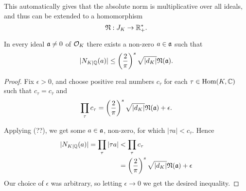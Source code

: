 This automatically gives that the absolute norm is multiplicative over all ideals, and thus can be extended to a homomorphism
\[
	\mathfrak{N} : J_K \to \mathbb{R}^*_+.
\]

\begin{lem}
	In every ideal $\mathfrak{a}\neq 0$ of $\mathcal{O}_K$ there exists a non-zero $a\in\mathfrak{a}$ such that
	\[
		|N_{K\mid\mathbb{Q}}(a)| \leq \left(\frac{2}{\pi}\right)^s\sqrt{|d_K|}\mathfrak{N}(\mathfrak{a}).
	\]
\end{lem}
\begin{proof}
	Fix $\epsilon>0$, and choose positive real numbers $c_\tau$ for each $\tau\in\text{Hom}(K,\mathbb{C})$ such that $c_\tau = c_{\overline{\tau}}$ and
	\[
		\prod_\tau c_\tau = \left(\frac{2}{\pi}\right)^s\sqrt{|d_K|}\mathfrak{N}(\mathfrak{a})+ \epsilon.
	\]

	Applying (??), we get some $a\in\mathfrak{a}$, non-zero, for which $|\tau a|<c_\tau$. Hence
	\begin{align*}
		|N_{K\mid\mathbb{Q}}(a)| = \prod_\tau |\tau a| &< \prod_\tau c_\tau\\
			&= \left(\frac{2}{\pi}\right)^s\sqrt{|d_K|}\mathfrak{N}(\mathfrak{a})+ \epsilon
	\end{align*}
	Our choice of $\epsilon$ was arbitrary, so letting $\epsilon\to 0$ we get the desired inequality.
\end{proof}

